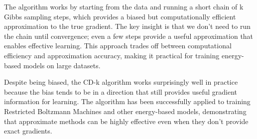 The algorithm works by starting from the data and running a short chain of k Gibbs sampling steps, which provides a biased but computationally efficient approximation to the true gradient. The key insight is that we don't need to run the chain until convergence; even a few steps provide a useful approximation that enables effective learning. This approach trades off between computational efficiency and approximation accuracy, making it practical for training energy-based models on large datasets.

Despite being biased, the CD-k algorithm works surprisingly well in practice because the bias tends to be in a direction that still provides useful gradient information for learning. The algorithm has been successfully applied to training Restricted Boltzmann Machines and other energy-based models, demonstrating that approximate methods can be highly effective even when they don't provide exact gradients.





